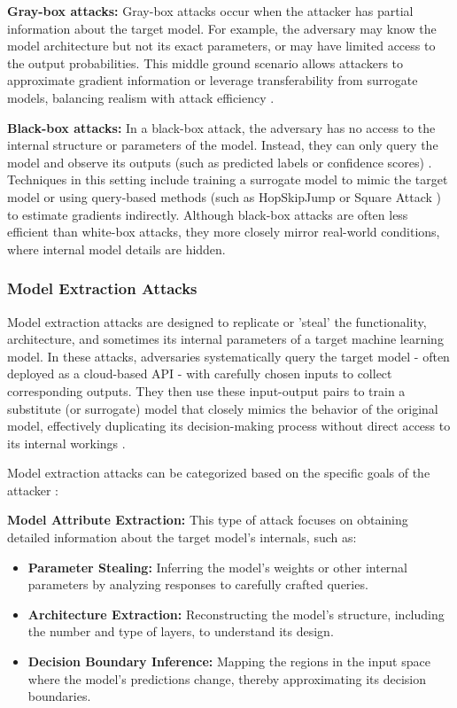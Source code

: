 \documentclass[conference]{IEEEtran}
\begin{document}
\textbf{Gray-box attacks:}
Gray-box attacks occur when the attacker has partial information about the target model. For example, the adversary may know the model architecture but not its exact parameters, or may have limited access to the output probabilities. This middle ground scenario allows attackers to approximate gradient information or leverage transferability from surrogate models, balancing realism with attack efficiency \cite{ren2020adversarial}.

\textbf{Black-box attacks:}
In a black-box attack, the adversary has no access to the internal structure or parameters of the model. Instead, they can only query the model and observe its outputs (such as predicted labels or confidence scores) \cite{ren2020adversarial}. Techniques in this setting include training a surrogate model to mimic the target model or using query-based methods (such as HopSkipJump \cite{newaz2020adversarial} or Square Attack \cite{andriushchenko2020square}) to estimate gradients indirectly. Although black-box attacks are often less efficient than white-box attacks, they more closely mirror real-world conditions, where internal model details are hidden.


\subsubsection{Model Extraction Attacks}
Model extraction attacks are designed to replicate or 'steal' the functionality, architecture, and sometimes its internal parameters of a target machine learning model. In these attacks, adversaries systematically query the target model - often deployed as a cloud-based API - with carefully chosen inputs to collect corresponding outputs. They then use these input-output pairs to train a substitute (or surrogate) model that closely mimics the behavior of the original model, effectively duplicating its decision-making process without direct access to its internal workings \cite{golla2023security}.

Model extraction attacks can be categorized based on the specific goals of the attacker \cite{gong2020model}:

\textbf{Model Attribute Extraction:}
This type of attack focuses on obtaining detailed information about the target model's internals, such as:
\begin{itemize}
  \item \textbf{Parameter Stealing:} Inferring the model's weights or other internal parameters by analyzing responses to carefully crafted queries.
  \item \textbf{Architecture Extraction:} Reconstructing the model’s structure, including the number and type of layers, to understand its design.
  \item \textbf{Decision Boundary Inference:} Mapping the regions in the input space where the model’s predictions change, thereby approximating its decision boundaries.
\end{itemize}
\end{document}
